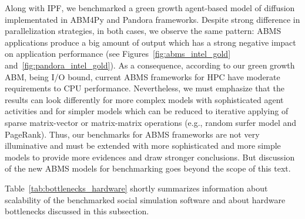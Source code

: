 Along  with IPF,
we benchmarked a green growth agent-based model of diffusion implementated in \textsf{ABM4Py} and \textsf{Pandora} frameworks.
Despite strong difference in parallelization  strategies,
in  both  cases,  we  observe  the same pattern:
ABMS  applications produce  a  big  amount  of  output  which  has  a  strong  negative  impact  on  application performance
(see Figures~\ref{fig:abms_intel_gold} and~\ref{fig:pandora_intel_gold}).
As a consequence, according to our green growth ABM, being I/O bound,
current ABMS frameworks for HPC have moderate requirements to CPU performance.
Nevertheless, we must emphasize that the results can look differently for
more complex models with sophisticated agent activities
and for simpler models which can be reduced to iterative applying of sparse matrix-vector or matrix-matrix operations
(e.g., random surfer model and PageRank).
Thus, our benchmarks for ABMS frameworks are not very illuminative
and must  be  extended  with  more sophisticated and more simple models to provide more evidences and draw stronger conclusions.
But discussion of the new ABMS models for benchmarking goes beyond the scope of this text.

Table~\ref{tab:bottlenecks_hardware} shortly summarizes information about scalability of the benchmarked social simulation software
and about hardware bottlenecks discussed in this subsection.





